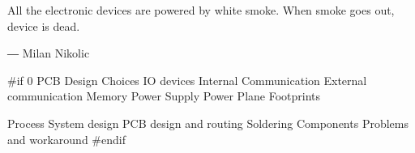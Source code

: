 All the electronic devices are powered by white smoke. When smoke goes out, device is dead.

― Milan Nikolic



 \label{pcb:section:design_choices}
 \label{pcb:section:power_supply}
 \label{pcb:section:power_plane}
 \label{pcb:section:footprints}
 \label{pcb:section:process}
 \label{pcb:section:components}
 \label{pcb:section:problems_and_workaround}

#if 0
PCB
    Design Choices
        IO devices
        Internal Communication
        External communication
        Memory
    Power Supply
    Power Plane
    Footprints
        
    Process
        System design
        PCB design and routing
        Soldering
    Components
    Problems and workaround
#endif
